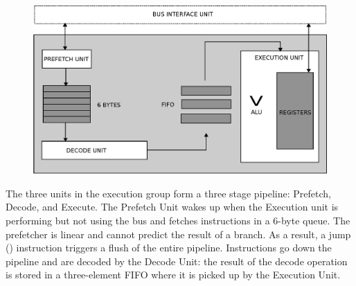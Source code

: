 \documentclass[book.tex]{subfiles}
\begin{document}
\begin{figure}[H]
\centering
\includegraphics[width=\textwidth]{imgs/drawings/processing_unit.eps}
\end{figure}
\par
The three units in the execution group form a three stage pipeline: Prefetch, Decode, and Execute. The Prefetch Unit wakes up when the Execution unit is performing but not using the bus and fetches instructions in a 6-byte queue. The prefetcher is linear and cannot predict the result of a branch. As a result, a jump () instruction triggers a flush of the entire pipeline. Instructions go down the pipeline and are decoded by the Decode Unit: the result of the decode operation is stored in a three-element FIFO where it is picked up by the Execution Unit.\\
\par
\end{document}
